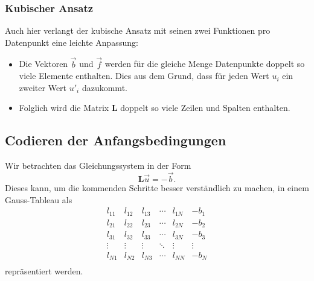 \subsubsection{Kubischer Ansatz}
Auch hier verlangt der kubische Ansatz mit seinen zwei Funktionen pro Datenpunkt eine leichte Anpassung: 
\begin{itemize}
    \item Die Vektoren $\vec{b}$ und $\vec{f}$ werden für die gleiche Menge Datenpunkte doppelt so viele Elemente enthalten.
          Dies aus dem Grund, dass für jeden Wert $u_i$ ein zweiter Wert $u'_i$ dazukommt.
    \item Folglich wird die Matrix $\mathbf{L}$ doppelt so viele Zeilen und Spalten enthalten. 
\end{itemize}


\subsection{Codieren der Anfangsbedingungen\label{fem:1d:anfangsbedingungen}}
Wir betrachten das Gleichungssystem in der Form 
\begin{equation}
    \mathbf{L}\vec{u} = -\vec{b}. 
    \label{fem:1d:gleichungssystem}
\end{equation}
Dieses kann, um die kommenden Schritte besser verständlich zu machen, in einem Gauss-Tableau als
\begin{equation}
    \boxed{
        \begin{matrix}
            l_{11} & l_{12} & l_{13} & \cdots & l_{1N} & -b_1   \\
            l_{21} & l_{22} & l_{23} & \cdots & l_{2N} & -b_2   \\
            l_{31} & l_{32} & l_{33} & \cdots & l_{3N} & -b_3   \\
            \vdots & \vdots & \vdots & \ddots & \vdots & \vdots \\
            l_{N1} & l_{N2} & l_{N3} & \cdots & l_{NN} & -b_N   \\
        \end{matrix}
    }
\end{equation}
repräsentiert werden.

